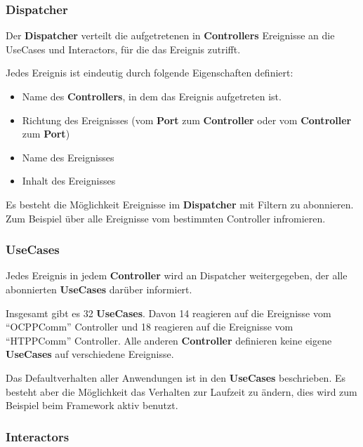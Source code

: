 \subsubsection{Dispatcher}
Der \textbf{Dispatcher} verteilt die aufgetretenen in \textbf{Controllers} Ereignisse an die UseCases und Interactors, für die das Ereignis zutrifft.

Jedes Ereignis ist eindeutig durch folgende Eigenschaften definiert:
\begin{itemize}
    \item Name des \textbf{Controllers}, in dem das Ereignis aufgetreten ist.
    \item Richtung des Ereignisses (vom \textbf{Port} zum \textbf{Controller} oder vom \textbf{Controller} zum \textbf{Port})
    \item Name des Ereignisses
    \item Inhalt des Ereignisses
\end{itemize}

Es besteht die Möglichkeit Ereignisse im \textbf{Dispatcher} mit Filtern zu abonnieren. 
Zum Beispiel über alle Ereignisse vom bestimmten Controller infromieren.

\subsubsection{UseCases}

Jedes Ereignis in jedem \textbf{Controller} wird an Dispatcher weitergegeben, der alle abonnierten \textbf{UseCases} darüber informiert.

Insgesamt gibt es 32 \textbf{UseCases}. 
Davon 14 reagieren auf die Ereignisse vom ``OCPPComm'' Controller und 18 reagieren auf die Ereignisse vom ``HTPPComm'' Controller. 
Alle anderen \textbf{Controller} definieren keine eigene \textbf{UseCases} auf verschiedene Ereignisse.

Das Defaultverhalten aller Anwendungen ist in den \textbf{UseCases} beschrieben. Es besteht aber die Möglichkeit das Verhalten zur Laufzeit zu ändern, 
dies wird zum Beispiel beim Framework aktiv benutzt.

\newpage
\subsubsection{Interactors}

